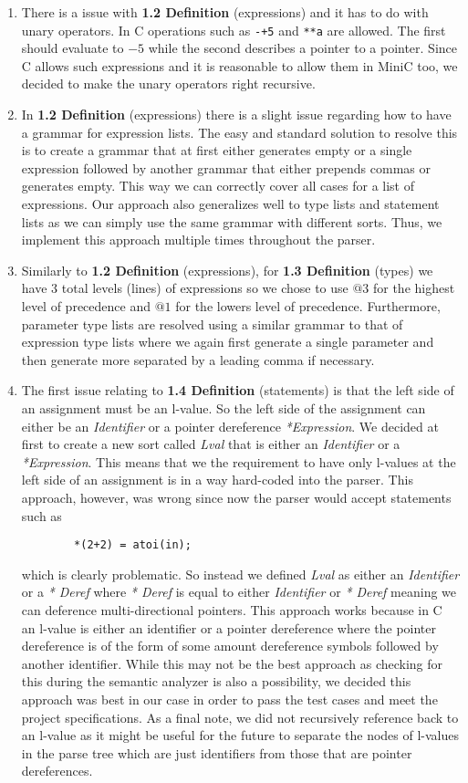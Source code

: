\documentclass{article}
\begin{document}
\begin{enumerate}
    \item There is a issue with \textbf{1.2 Definition} (expressions) and it has to do with unary operators. In C operations such as \texttt{-+5} and \texttt{**a} are allowed. The first should evaluate to $-5$ while the second describes a pointer to a pointer. Since C allows such expressions and it is reasonable to allow them in MiniC too, we decided to make the unary operators right recursive.
    \item In \textbf{1.2 Definition} (expressions) there is a slight issue regarding how to have a grammar for expression lists. The easy and standard solution to resolve this is to create a grammar that at first either generates empty or a single expression followed by another grammar that either prepends commas or generates empty. This way we can correctly cover all cases for a list of expressions. Our approach also generalizes well to type lists and statement lists as we can simply use the same grammar with different sorts. Thus, we implement this approach multiple times throughout the parser.
    \item Similarly to \textbf{1.2 Definition} (expressions), for \textbf{1.3 Definition} (types) we have $3$ total levels (lines) of expressions so we chose to use $@3$ for the highest level of precedence and $@1$ for the lowers level of precedence. Furthermore, parameter type lists are resolved using a similar grammar to that of expression type lists where we again first generate a single parameter and then generate more separated by a leading comma if necessary.
    \item The first issue relating to \textbf{1.4 Definition} (statements) is that the left side of an assignment must be an l-value. So the left side of the assignment can either be an \textit{Identifier} or a pointer dereference \textit{*Expression}. We decided at first to create a new sort called \textit{Lval} that is either an \textit{Identifier} or a \textit{*Expression}. This means that we the requirement to have only l-values at the left side of an assignment is in a way hard-coded into the parser. This approach, however, was wrong since now the parser would accept statements such as
    \begin{verbatim}
        *(2+2) = atoi(in);
    \end{verbatim}
    which is clearly problematic. So instead we defined \textit{Lval} as either an \textit{Identifier} or a \textit{* Deref} where \textit{* Deref} is equal to either \textit{Identifier} or \textit{* Deref} meaning we can deference multi-directional pointers. This approach works because in C an l-value is either an identifier or a pointer dereference where the pointer dereference is of the form of some amount dereference symbols followed by another identifier. While this may not be the best approach as checking for this during the semantic analyzer is also a possibility, we decided this approach was best in our case in order to pass the test cases and meet the project specifications. As a final note, we did not recursively reference back to an l-value as it might be useful for the future to separate the nodes of l-values in the parse tree which are just identifiers from those that are pointer dereferences.

\end{enumerate}
\end{document}
